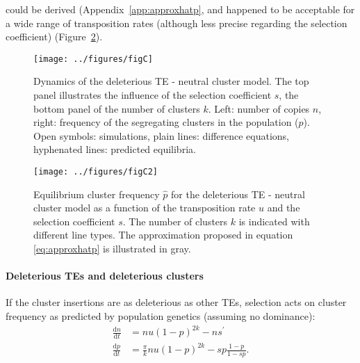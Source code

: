 \documentclass[10pt,a4paper]{article}
\begin{document}
\noindent could be derived (Appendix~\ref{app:approxhatp}, and happened to be acceptable for a wide range of transposition rates (although less precise regarding the selection coefficient) (Figure~\ref{fig:figC2}). 

\begin{figure}[h]
\begin{adjustwidth}{-1in}{0in}
\begin{flushright}
	\texttt{[image: ../figures/figC]}
\caption{\label{fig:figC} Dynamics of the deleterious TE - neutral cluster model. The top panel illustrates the influence of the selection coefficient $s$, the bottom panel of the number of clusters $k$. Left: number of copies $n$, right: frequency of the segregating clusters in the population ($p$). Open symbols: simulations, plain lines: difference equations, hyphenated lines: predicted equilibria. }
\end{flushright}\end{adjustwidth}
\end{figure}

\begin{figure}[h]
\begin{adjustwidth}{-1in}{0in}
\begin{flushright}
	\texttt{[image: ../figures/figC2]}
\caption{\label{fig:figC2} Equilibrium cluster frequency $\hat p$ for the deleterious TE - neutral cluster model as a function of the transposition rate $u$ and the selection coefficient $s$. The number of clusters $k$ is indicated with different line types. The approximation proposed in equation \ref{eq:approxhatp} is illustrated in gray. }
\end{flushright}\end{adjustwidth}
\end{figure}


\paragraph{Deleterious TEs and deleterious clusters} If the cluster insertions are as deleterious as other TEs, selection acts on cluster frequency as predicted by population genetics (assuming no dominance): 
\begin{equation}\label{eq:selps}
\begin{split}
\frac{\mathrm d n}{\mathrm d t} &= n u (1-p)^{2k} - n s^\prime \\
\frac{\mathrm d p}{\mathrm d t} &= \frac{\pi}{k} n u (1-p)^{2k} - s p \frac{1-p}{1- s p}.
\end{split}
\end{equation}
\end{document}
